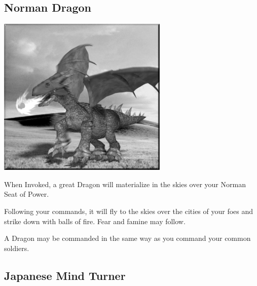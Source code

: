 \subsection{Norman Dragon}

\begin{center}
	\includegraphics[width=1\linewidth]{Adragon}
\end{center}

When Invoked, a great Dragon will materialize in the skies over your Norman Seat of Power.

Following your commands, it will fly to the skies over the cities of your foes and strike down with balls of fire. Fear and famine may follow.

A Dragon may be commanded in the same way as you command your common soldiers.

\subsection{Japanese Mind Turner}

